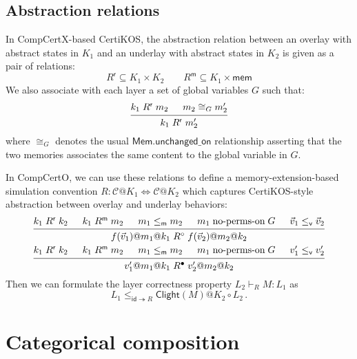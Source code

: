 \documentclass{article}
\begin{document}
\subsection{Abstraction relations} %

In CompCertX-based CertiKOS,
the abstraction relation between
an overlay with abstract states in $K_1$ and
an underlay with abstract states in $K_2$
is given as a pair of relations:
\[
  R^\mathsf{r} \subseteq K_1 \times K_2
  \qquad
  R^\mathsf{m} \subseteq K_1 \times \mathsf{mem}
\]
We also associate with each layer a set of global variables $G$
such that:
\[
  \begin{prooftree}
    \hypo{k_1 \mathrel{R^\mathsf{r}} m_2}
    \hypo{m_2 \cong_G m_2'}
    \infer2{k_1 \mathrel{R^\mathsf{r}} m_2'}
  \end{prooftree}
\]
where $\cong_G$ denotes the usual $\mathsf{Mem.unchanged\_on}$
relationship asserting that the two memories
associates the same content to the global variable in $G$.

In CompCertO,
we can use these relations to define a
memory-extension-based simulation convention
$R : \mathcal{C}@K_1 \Leftrightarrow \mathcal{C}@K_2$
which captures CertiKOS-style abstraction between
overlay and underlay behaviors:
\begin{gather*}
 {\begin{prooftree}
    \hypo{k_1 \mathrel{R^\mathsf{r}} k_2}
    \hypo{k_1 \mathrel{R^\mathsf{m}} m_2}
    \hypo{m_1 \le_\mathsf{m} m_2}
    \hypo{m_1 \mathrel\text{no-perms-on} G}
    \hypo{\vec{v}_1 \le_\mathsf{v} \vec{v}_2}
    \infer5{f(\vec{v}_1)@m_1@k_1 \mathrel{R^\circ} f(\vec{v}_2)@m_2@k_2}
  \end{prooftree}}
\\
 {\begin{prooftree}
    \hypo{k_1 \mathrel{R^\mathsf{r}} k_2}
    \hypo{k_1 \mathrel{R^\mathsf{m}} m_2}
    \hypo{m_1 \le_\mathsf{m} m_2}
    \hypo{m_1 \mathrel\text{no-perms-on} G}
    \hypo{v'_1 \le_\mathsf{v} v'_2}
    \infer5{v'_1@m_1@k_1 \mathrel{R^\bullet} v'_2@m_2@k_2}
  \end{prooftree}}
\end{gather*}
Then we can
formulate the layer correctness property
$L_2 \vdash_R M : L_1$ as
\[
    L_1 \le_{\mathsf{id} \twoheadrightarrow R}
    \mathsf{Clight}(M)@K_2 \circ L_2
    \,.
\]



\section{Categorical composition} %
\end{document}
